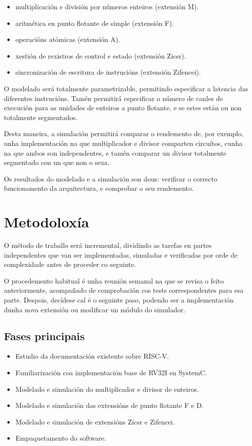 \begin{itemize}
    \item multiplicación e división por números enteiros (extensión M).
    \item aritmética en punto flotante de simple (extensión F).
    \item operacións atómicas  (extensión A).
    \item xestión de rexistros de control e estado (extensión Zicsr).
    \item sincronización de escritura de instrucións (extensión Zifencei).
\end{itemize}

O modelado será totalmente parametrizable, permitindo especificar a latencia das diferentes instrucións. Tamén permitirá especificar o número de canles de execución para as unidades de enteiros a punto flotante, e se estes están ou non totalmente segmentados. 

Desta maneira, a simulación permitirá comparar o rendemento de, por exemplo, unha implementación na que multiplicador e divisor comparten circuítos, cunha na que ambos son independentes, e tamén comparar un divisor totalmente segmentado con un que non o sexa. 

Os resultados do modelado e a simulación son dous: verificar o correcto funcionamento da arquitectura, e comprobar o seu rendemento. 


\section{Metodoloxía}
\label{sec:metodoloxía}
O método de traballo será incremental, dividindo as tarefas en partes independentes que van ser implementadas, simuladas e verificadas por orde de complexidade antes de proceder co seguinte.

O procedemento habitual é unha reunión semanal na que se revisa o feito anteriormente, acompañado de comprobación cos tests correspondentes para esa parte. Despois, decídese cal é o seguinte paso, podendo ser a implementación dunha nova extensión ou modificar un módulo do simulador.

\subsection{Fases principais}
\begin{itemize}
    \item Estudio da documentación existente sobre RISC-V.
    \item Familiarización coa implementación base de RV32I en SystemC. 
    \item Modelado e simulación do multiplicador e divisor de enteiros. 
    \item Modelado e simulación das extensións de punto flotante F e D. 
    \item Modelado e simulación de extensións Zicsr e  Zifencei.
    \item Empaquetamento do software. 

\end{itemize}

